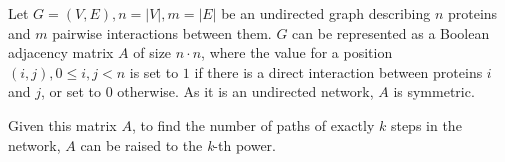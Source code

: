 
Let $G=(V,E), n=|V|, m=|E|$ be an undirected graph describing $n$
proteins and $m$ pairwise interactions between them. $G$ can be represented as a Boolean 
adjacency matrix $A$ of size $n\cdot n$, where the value for a position
$(i,j), 0\leq i,j < n$ is set to $1$ if there is a direct interaction
between proteins $i$ and $j$, or set to $0$ otherwise. As it is an undirected network, $A$ is symmetric.

Given this matrix $A$, to find the number of paths of exactly $k$ steps  in the network, $A$ can be raised to the \textit{k}-th power. 